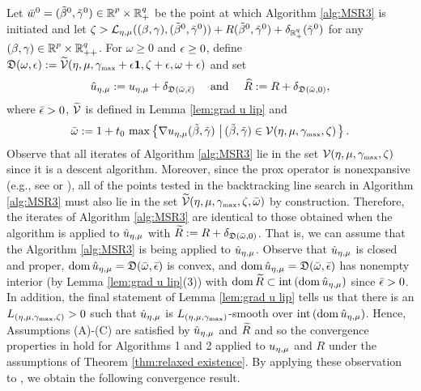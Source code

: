 Let ${\bar w}^{0}=(\tilde\beta^0,{\tilde{\gamma}}^0)\in {\operatorname{\mathbb{R}}^p}\times\operatorname{\mathbb{R}}^q_+$ be the point at which Algorithm \ref{alg:MSR3}
is initiated and let
$\zeta>\operatorname{\mathcal{L}}_{{\eta,\mu}}((\beta,\gamma),(\tilde\beta^0,{\tilde{\gamma}}^0)) 
+ R(\tilde\beta^0,{\tilde{\gamma}}^0)+\delta_{\operatorname{\mathbb{R}}^q_+}({\tilde{\gamma}}^0)$ for any 
$(\beta,\gamma) \in {\operatorname{\mathbb{R}}^p}\times\operatorname{\mathbb{R}}^q_{++}$. 
For $\omega\ge 0$ and $\epsilon\ge 0$, define
\(
\mathfrak{D}(\omega,\epsilon):=\widetilde
{{\mathcal{V}}}(\eta,\mu,{\gamma_{\mbox{\tiny max}}}+\epsilon\mathbf{1},\zeta+\epsilon,\omega+\epsilon)
\)
and set
\begin{equation}\label{eq:hats}
\hat u_{\eta,\mu}:={u_{\eta,\mu}}+\delta_{\mathfrak{D}({\bar\omega},{\bar\epsilon})}\quad\text{ and }\quad
{\widehat R}:=R+\delta_{\mathfrak{D}({\bar\omega},0)},
\end{equation}
where ${\bar\epsilon}>0$, $\widetilde{{\mathcal{V}}}$ is defined in Lemma \ref{lem:grad u lip} and
\[
{\bar\omega}:=1+t_0\,\max\left\{\nabla {u_{\eta,\mu}}(\tilde\beta,{\tilde{\gamma}})\,\left|\,(\tilde\beta,{\tilde{\gamma}})\in{\mathcal{V}}(\eta,\mu,{\gamma_{\mbox{\tiny max}}},\zeta)\right.\right\}.
\]
Observe that all iterates of Algorithm \ref{alg:MSR3} 
lie in the set ${\mathcal{V}}(\eta,\mu,{\gamma_{\mbox{\tiny max}}},\zeta)$
since it is a descent algorithm.
Moreover, since the prox operator is nonexpansive 
(e.g., see  
\cite[Theorem 6.42(a)]{AB17} or \cite[Theorem 12.19]{rockafellar2009variational}),
all of the points tested in the backtracking line search in Algorithm 
\ref{alg:MSR3} 
must also
lie in the set $\widetilde{{\mathcal{V}}}(\eta,\mu,{\gamma_{\mbox{\tiny max}}},\zeta,{\bar\omega})$ by construction.
Therefore, the iterates of Algorithm \ref{alg:MSR3} 
are identical to those obtained
when the algorithm is applied to $\hat u_{\eta,\mu}$ with 
${\widetilde R}:=R+\delta_{\mathfrak{D}({\bar\omega},0)}$.
That is, we can assume
that the Algorithm \ref{alg:MSR3} 
is being applied to $\hat u_{\eta,\mu}$. 
Observe that $\hat u_{\eta,\mu}$ is closed and proper,
$\operatorname{\mathrm{dom}}{\hat u_{\eta,\mu}}=\mathfrak{D}({\bar\omega},{\bar\epsilon})$ is convex, and
 $\operatorname{\mathrm{dom}}{\hat u_{\eta,\mu}}=\mathfrak{D}({\bar\omega},{\bar\epsilon})$
has nonempty interior (by Lemma \ref{lem:grad u lip}(3)) with $\operatorname{\mathrm{dom}}{{\widetilde R}}\subset \mathrm{int}\left( \operatorname{\mathrm{dom}}{\hat u_{\eta,\mu}}\right)$ since ${\bar\epsilon}>0$. 
In addition, the final statement of Lemma \ref{lem:grad u lip}
tells us that there is an $L_{({\eta,\mu},{\gamma_{\mbox{\tiny max}}},\zeta)}>0$ 
such that $\hat u_{\eta,\mu}$ is 
$L_{({\eta,\mu},{\gamma_{\mbox{\tiny max}}})}$-smooth over $\mathrm{int}\left( \operatorname{\mathrm{dom}}{\hat u_{\eta,\mu}}\right)$. Hence, 
Assumptions (A)-(C) are satisfied by $\hat u_{\eta,\mu}$ and ${\widetilde R}$ and so the 
convergence properties in \cite[Theorem 10.15]{AB17} hold for Algorithms
1 and 2 applied to ${u_{\eta,\mu}}$ and $R$ under the assumptions of Theorem  
\ref{thm:relaxed existence}. By applying these observation
to \cite[Theorem 10.15]{AB17}, we obtain the following convergence result.

